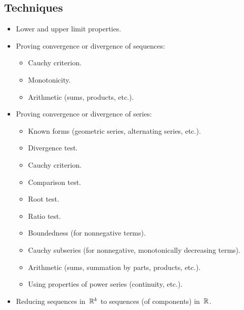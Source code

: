 \subsection*{Techniques}
\begin{itemize}[itemsep=0pt]
\item Lower and upper limit properties.
\item Proving convergence or divergence of sequences:
\begin{itemize}[itemsep=0pt]
\item Cauchy criterion.
\item Monotonicity.
\item Arithmetic (sums, products, etc.).
\end{itemize}
\item Proving convergence or divergence of series:
\begin{itemize}[itemsep=0pt]
\item Known forms (geometric series, alternating series, etc.).
\item Divergence test.
\item Cauchy criterion.
\item Comparison test.
\item Root test.
\item Ratio test.
\item Boundedness (for nonnegative terms).
\item Cauchy subseries (for nonnegative, monotonically decreasing terms).
\item Arithmetic (sums, summation by parts, products, etc.).
\item Using properties of power series (continuity, etc.).
\end{itemize}
\item Reducing sequences in~\(\mathbb{R}^k\) to sequences (of components) in~\(\mathbb{R}\).
\end{itemize}
